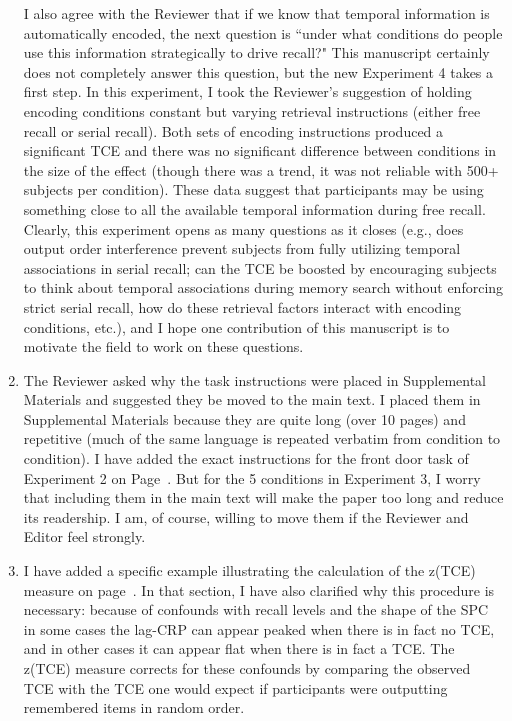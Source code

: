 \documentclass[12pt]{article}
\begin{document}
\begin{enumerate}
	I also agree with the Reviewer that if we know that temporal information is automatically encoded, the next question is ``under what conditions do people use this information strategically to drive recall?" This manuscript certainly does not completely answer this question, but the new Experiment 4 takes a first step. In this experiment, I took the Reviewer's suggestion of holding encoding conditions constant but varying retrieval instructions (either free recall or serial recall). Both sets of encoding instructions produced a significant TCE and there was no significant difference between conditions in the size of the effect (though there was a trend, it was not reliable with 500+ subjects per condition). These data suggest that participants may be using something close to all the available temporal information during free recall. Clearly, this experiment opens as many questions as it closes (e.g., does output order interference prevent subjects from fully utilizing temporal associations in serial recall; can the TCE be boosted by encouraging subjects to think about temporal associations during memory search without enforcing strict serial recall, how do these retrieval factors interact with encoding conditions, etc.), and I hope one contribution of this manuscript is to motivate the field to work on these questions.

	\item
	The Reviewer asked why the task instructions were placed in Supplemental Materials and suggested they be moved to the main text. I placed them in Supplemental Materials because they are quite long (over 10 pages) and repetitive (much of the same language is repeated verbatim from condition to condition). I have added the exact instructions for the front door task of Experiment 2 on Page~\pageref{newinst}. But for the 5 conditions in Experiment 3, I worry that including them in the main text will make the paper too long and reduce its readership. I am, of course, willing to move them if the Reviewer and Editor feel strongly.

	\item
	I have added a specific example illustrating the calculation of the z(TCE) measure on page~\pageref{TCEex}. In that section, I have also clarified why this procedure is necessary: because of confounds with recall levels and the shape of the SPC in some cases the lag-CRP can appear peaked when there is in fact no TCE, and in other cases it can appear flat when there is in fact a TCE. The z(TCE) measure corrects for these confounds by comparing the observed TCE with the TCE one would expect if participants were outputting remembered items in random order.


\end{enumerate}
\end{document}
